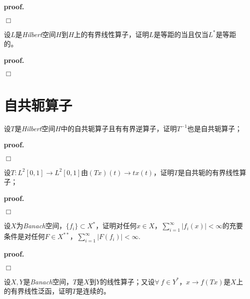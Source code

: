 \textbf{proof. }

$\Box$

\begin{mdframed}
    \begin{question}
        设$L$是\textsl{Hilbert}空间$H$到$H$上的有界线性算子，证明$L$是等距的当且仅当$L^*$是等距的。
    \end{question}
\end{mdframed}

\textbf{proof. }

$\Box$

\section{自共轭算子}

\begin{mdframed}
    \begin{question}
        设$T$是\textsl{Hilbert}空间$H$中的自共轭算子且有有界逆算子，证明$T^{-1}$也是自共轭算子；
    \end{question}
\end{mdframed}

\textbf{proof. }

$\Box$

\begin{mdframed}
    \begin{question}
        设$T:L^2[0,1]\rightarrow L^2[0,1]$由$(Tx)(t)\rightarrow tx(t)$，证明$T$是自共轭的有界线性算子；
    \end{question}
\end{mdframed}

\textbf{proof. }

$\Box$

\begin{mdframed}
    \begin{question}
        设$X$为\textsl{Banach}空间，$\{f_i\}\subset X^*$，证明对任何$x\in X$，$\sum_{i=1}^{\infty}|f_i(x)|<\infty$的充要条件是对任何$F\in X^{**}$，$\sum_{i=1}^{\infty}|F(f_i)|<\infty$.
    \end{question}
\end{mdframed}

\textbf{proof. }

$\Box$

\begin{mdframed}
    \begin{question}
        设$X,Y$是\textsl{Banach}空间，$T$是$X$到$Y$的线性算子；又设$\forall\ f\in Y^*$，$x\rightarrow f(Tx)$是$X$上的有界线性泛函，证明$T$是连续的。
    \end{question}
\end{mdframed}

